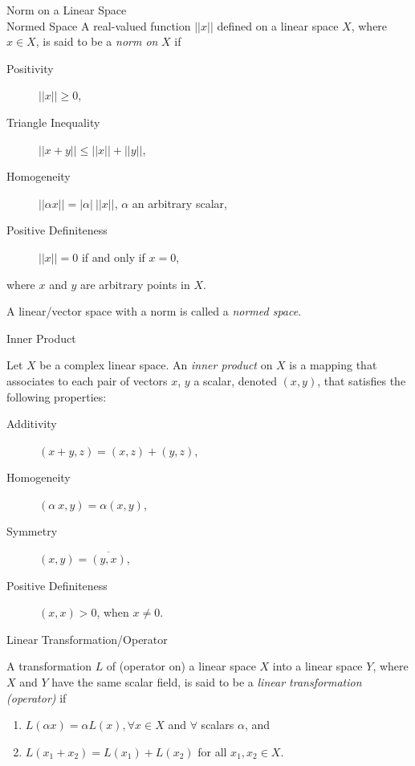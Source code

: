 \documentclass[avery5388,grid,frame]{flashcards}
\begin{document}

\begin{flashcard}[Definition]{Norm on a Linear Space \\ Normed Space}
A real-valued function $||x||$ defined on a linear space $X$, where
$x \in X$, is said to be a \emph{norm on} $X$ if
\smallskip

\begin{description}
\item [Positivity] $||x|| \geq 0$,
\item [Triangle Inequality] $||x+y|| \leq ||x|| + ||y||$,
\item [Homogeneity] $||\alpha x|| = |\alpha| \: ||x||$,
$\alpha$ an arbitrary scalar,
\item [Positive Definiteness] $||x|| = 0$ if and only if $x=0$,
\end{description}

\smallskip

where $x$ and $y$ are arbitrary points in $X$.

\medskip

A linear/vector space with a norm is called a \emph{normed space}.
\end{flashcard}


\begin{flashcard}[Definition]{Inner Product}

Let $X$ be a complex linear space. An \emph{inner product} on $X$ is
a mapping that associates to each pair of vectors $x$, $y$ a scalar,
denoted $(x,y)$, that satisfies the following properties:

\medskip

\begin{description}
\item [Additivity] $(x+y,z) = (x,z) + (y,z)$,
\item [Homogeneity] $(\alpha \: x, y) = \alpha (x,y)$,
\item [Symmetry] $(x,y) = \overline{(y,x)}$,
\item [Positive Definiteness] $(x,x) > 0$, when $x\neq0$.
\end{description}
\end{flashcard}


\begin{flashcard}[Definition]{Linear Transformation/Operator}

A transformation $L$ of (operator on) a linear space $X$ into a linear
space $Y$, where $X$ and $Y$ have the same scalar field, is said to be
a \emph{linear transformation (operator)} if

\medskip

\begin{enumerate}
\item $L(\alpha x) = \alpha L(x), \forall x\in X$ and $\forall$
scalars $\alpha$, and
\item $L(x_1 + x_2) = L(x_1) + L(x_2)$ for all $x_1,x_2 \in X$.
\end{enumerate}

\end{flashcard}
\end{document}
